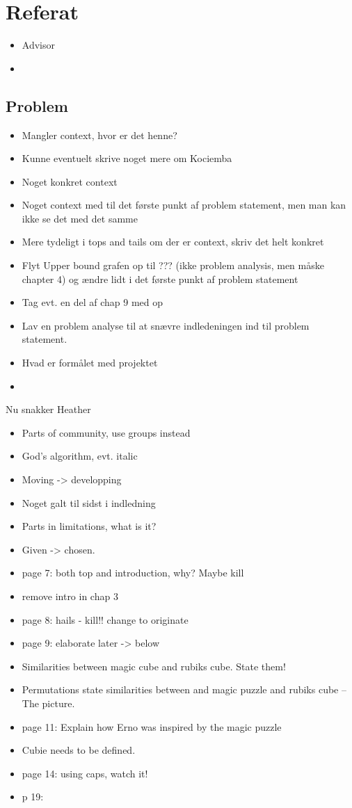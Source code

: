 \section{Referat}
\label{ref}
\begin{itemize}
	\item Advisor
	\item 
\end{itemize}

\subsection{Problem}
\begin{itemize}
	\item Mangler context, hvor er det henne?
	\item Kunne eventuelt skrive noget mere om Kociemba
	\item Noget konkret context
	\item Noget context med til det første punkt af problem statement, men man kan ikke se det med det samme
	\item Mere tydeligt i tops and tails om der er context, skriv det helt konkret
	\item Flyt Upper bound grafen op til ??? (ikke problem analysis, men måske chapter 4) og ændre lidt i det første punkt af problem statement
	\item Tag evt. en del af chap 9 med op
	\item Lav en problem analyse til at snævre indledeningen ind til problem statement.
	\item Hvad er formålet med projektet
	\item 
\end{itemize}


Nu snakker Heather
\begin{itemize}
	\item Parts of community, use groups instead
	\item God's algorithm, evt. italic
	\item Moving -> developping
	\item Noget galt til sidst i indledning
	\item Parts in limitations, what is it?
	\item Given -> chosen.
	\item page 7: both top and introduction, why? Maybe kill
	\item remove intro in chap 3
	\item page 8: hails - kill!! change to originate
	\item page 9: elaborate later -> below
	\item Similarities between magic cube and rubiks cube. State them!
	\item Permutations state similarities between and magic puzzle and rubiks cube -- The picture.
	\item page 11: Explain how Erno was inspired by the magic puzzle
	\item Cubie needs to be defined.
	\item page 14: using caps, watch it!
	\item p 19: 
\end{itemize}

